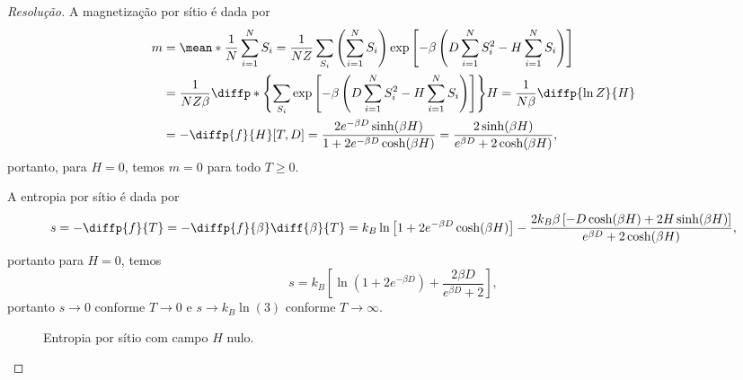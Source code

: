 \begin{proof}[Resolução]
    A magnetização por sítio é dada por
    \begin{align*}
        m &= \mean*{\frac{1}{N}\sum_{i=1}^N S_i} = \frac{1}{NZ}\sum_{S_i} \left(\sum_{i=1}^N S_i\right) \exp\left[-\beta \left(D\sum_{i=1}^N S_i^2 - H \sum_{i = 1}^N S_i\right)\right]\\
          &= \frac{1}{NZ \beta} \diffp*{\left\{\sum_{S_i}\exp\left[-\beta\left(D\sum_{i=1}^N S_i^2 - H \sum_{i=1}^N S_i\right)\right] \right\}}{H} = \frac{1}{N \beta} \diffp{\ln Z}{H}\\
          &= -\diffp{f}{H}[T,D] = \frac{2e^{-\beta D}\sinh(\beta H)}{1 + 2e^{-\beta D}\cosh(\beta H)} = \frac{2\sinh(\beta H)}{e^{\beta D} + 2\cosh(\beta H)},
    \end{align*}
    portanto, para \(H = 0\), temos \(m = 0\) para todo \(T \geq 0\).

    A entropia por sítio é dada por
    \begin{equation*}
        s = - \diffp{f}{T} = -\diffp{f}{\beta} \diff{\beta}{T} = k_B \ln\left[1 + 2 e^{-\beta D}\cosh(\beta H)\right] -  \frac{2k_B \beta\left[-D \cosh(\beta H) + 2H\sinh(\beta H)\right]}{e^{\beta D} + 2\cosh(\beta H)},
    \end{equation*}
    portanto para \(H = 0\), temos
    \begin{equation*}
        s = k_B \left[ \ln(1 + 2e^{-\beta D}) + \frac{2 \beta D}{e^{\beta D} + 2}\right],
    \end{equation*}
    portanto \(s \to 0\) conforme \(T \to 0\) e \(s \to k_B \ln(3)\) conforme \(T \to \infty\).
    \begin{figure}[!ht]
        \centering
        \caption{Entropia por sítio com campo \(H\) nulo.}
    \end{figure}


\end{proof}
